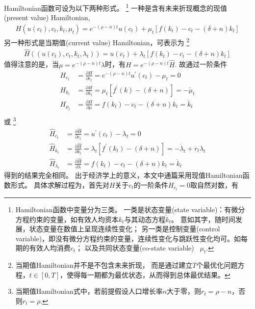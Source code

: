 \documentclass[cn,normal,11pt,black]{elegantnote}
\begin{document}
\begin{theorem}[Hamiltonian函数]
    Hamiltonian函数可设为以下两种形式。
    \footnote{Hamiltonian函数中变量分为三类。
    一类是状态变量(state variable)：有微分方程约束的变量，如有效人均资本$k_t$与其动态方程$\dot{k}_t$。
    意如其字，随时间发展，状态变量在数值上呈现连续性变化；
    另一类是控制变量(control variable)，即没有微分方程约束的变量，连续性变化与跳跃性变化均可。如每期的有效人均消费$c_t$；
    以及共同状态变量(co-state variable) \, $\mu_t$.}
    一种是含有未来折现概念的现值(present value) Hamiltonian,
    \begin{align*}
        H(u(c_t), c_t, k_t, \mu_t)= e^{-(\rho-n) t} u(c_t)+\mu_t [f(k_t)-c_t-(\delta+n) k_t]
    \end{align*}
    另一种形式是当期值(current value) Hamiltonian，可表示为
    \footnote{当期值Hamiltonian并不是不包含未来折现，
        而是通过建立$T$个最优化问题方程，$t \in [0,T]$，使得每一期都为最优状态，从而得到总体最优结果。}
    \begin{align*}
        \hat{H}((u(c_t), c_t, k_t, \lambda_t))=u(c_t)+\lambda_t [f(k_t) - c_t - (\delta+n) k_t]
    \end{align*}
    值得注意的是，当$\mu = e^{-(\rho-n) t} \lambda$时，有$H = e^{-(\rho-n) t} \hat{H}$.
    故通过一阶条件
    \begin{align*}
        H_{c_t} & = \frac{\partial H}{\partial c_t} = e^{-(\rho-n) t} u^{\prime}(c_t)-\mu_t =0 \\
        H_{k_t} & = \frac{\partial H}{\partial k_t}= \mu_t \left[f^{\prime}(k)-(\delta+n)\right] = -\dot{\mu}_t \\
        H_{\mu_t} & = \frac{\partial H}{\partial \mu} = f(k_t)-c_t-(\delta+n) k_t = \dot{k}_t \\
    \end{align*}
    或
    \footnote{当期值Hamiltonian式中，若前提假设人口增长率$n$大于零，则$r_t = \rho - n$，否则$r_t = \rho$.}
    \begin{align*}
        \hat{H}_{c_t} & = \frac{\partial \hat{H}}{\partial c_t} = u^{\prime}(c_t)-\lambda_t = 0 \\
        \hat{H}_{k_t} & = \frac{\partial \hat{H}}{\partial k_t}= \lambda_t \left[f^{\prime}(k_t)-(\delta+n)\right] = -\dot{\lambda}_t + r_t \lambda_t \\
        \hat{H}_{\lambda_t} & = \frac{\partial \hat{H}}{\partial \lambda} = f(k_t)- c_t - (\delta+n) k_t =\dot{k}_t 
    \end{align*}
    得到的结果完全相同。
    出于经济学上的意义，本文中通篇采用现值Hamiltonian函数形式。
    具体求解过程为，首先对$H$关于$c_t$的一阶条件$H_{c_t} = 0$取自然对数，有

\end{theorem}
\end{document}
